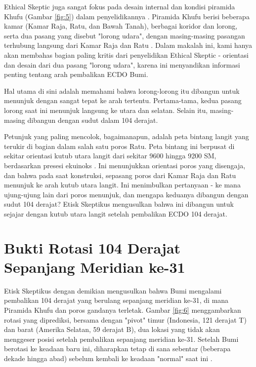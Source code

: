 \documentclass[10pt,twocolumn,letterpaper]{article}
\begin{document}
Ethical Skeptic juga sangat fokus pada desain internal dan kondisi piramida Khufu (Gambar \ref{fig:5}) dalam penyelidikannya \cite{28}. Piramida Khufu berisi beberapa kamar (Kamar Raja, Ratu, dan Bawah Tanah), berbagai koridor dan lorong, serta dua pasang yang disebut "lorong udara", dengan masing-masing pasangan terhubung langsung dari Kamar Raja dan Ratu \cite{29,30}. Dalam makalah ini, kami hanya akan membahas bagian paling kritis dari penyelidikan Ethical Skeptic - orientasi dan desain dari dua pasang "lorong udara", karena ini menyandikan informasi penting tentang arah pembalikan ECDO Bumi.

Hal utama di sini adalah memahami bahwa lorong-lorong itu dibangun untuk menunjuk dengan sangat tepat ke arah tertentu. Pertama-tama, kedua pasang lorong saat ini menunjuk langsung ke utara dan selatan. Selain itu, masing-masing dibangun dengan sudut dalam 104 derajat.

Petunjuk yang paling mencolok, bagaimanapun, adalah peta bintang langit yang terukir di bagian dalam salah satu poros Ratu. Peta bintang ini berpusat di sekitar orientasi kutub utara langit dari sekitar 9600 hingga 9200 SM, berdasarkan presesi ekuinoks \cite{28}. Ini menunjukkan orientasi poros yang disengaja, dan bahwa pada saat konstruksi, sepasang poros dari Kamar Raja dan Ratu menunjuk ke arah kutub utara langit. Ini menimbulkan pertanyaan - ke mana ujung-ujung lain dari poros menunjuk, dan mengapa keduanya dibangun dengan sudut 104 derajat? Etisk Skeptikus mengusulkan bahwa ini dibangun untuk sejajar dengan kutub utara langit setelah pembalikan ECDO 104 derajat.

\section{Bukti Rotasi 104 Derajat Sepanjang Meridian ke-31}

Etisk Skeptikus dengan demikian mengusulkan bahwa Bumi mengalami pembalikan 104 derajat yang berulang sepanjang meridian ke-31, di mana Piramida Khufu dan poros gandanya terletak. Gambar \ref{fig:6} menggambarkan rotasi yang diprediksi, bersama dengan "pivot" timur (Indonesia, 121 derajat T) dan barat (Amerika Selatan, 59 derajat B), dua lokasi yang tidak akan menggeser posisi setelah pembalikan sepanjang meridian ke-31. Setelah Bumi berotasi ke keadaan baru ini, diharapkan tetap di sana sebentar (beberapa dekade hingga abad) sebelum kembali ke keadaan "normal" saat ini \cite{150}.
\end{document}
